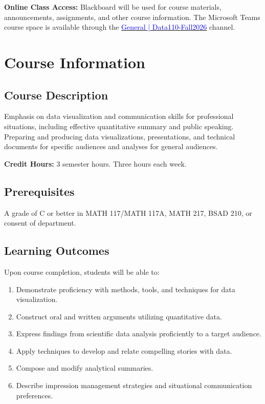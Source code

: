 \documentclass{exam}
\begin{document}
\noindent \textbf{Online Class Access:} Blackboard will be used for course materials, announcements, assignments, and other course information. The Microsoft Teams course space is available through the \href{https://teams.microsoft.com/l/team/19\%3AVSRlPh8qbhrTkXDovKRTuRAOkB_01cWJJ1WZeneAYbI1\%40thread.tacv2/conversations?groupId=7627d91b-7652-4611-947b-8faf8c4080ee\&tenantId=4d401e0b-6552-4e08-bd38-a8d15ca0ddd9}{\textcolor{blue}{General | Data110-Fall2026}} channel.

\section*{Course Information}

\subsection*{Course Description}
Emphasis on data visualization and communication skills for professional situations, including effective quantitative summary and public speaking. Preparing and producing data visualizations, presentations, and technical documents for specific audiences and analyses for general audiences.

\noindent \textbf{Credit Hours:} 3 semester hours. Three hours each week.

\subsection*{Prerequisites}
A grade of C or better in MATH 117/MATH 117A, MATH 217, BSAD 210, or consent of department.

\subsection*{Learning Outcomes}
Upon course completion, students will be able to:
\begin{enumerate}
    \item Demonstrate proficiency with methods, tools, and techniques for data visualization.
    \item Construct oral and written arguments utilizing quantitative data.
    \item Express findings from scientific data analysis proficiently to a target audience.
    \item Apply techniques to develop and relate compelling stories with data.
    \item Compose and modify analytical summaries.
    \item Describe impression management strategies and situational communication preferences.
\end{enumerate}
\end{document}
